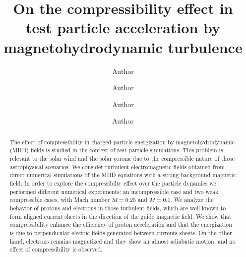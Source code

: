 \documentclass[%
aip,pop,amsmath,amssymb,
 reprint,%
]{revtex4-1}
\begin{document}



\title[]{On the compressibility effect in test particle acceleration 
by magnetohydrodynamic turbulence}%
\author{Author}
 \
\author{Author}
\
\author{Author}
 \
\author{Author}
 \


\begin{abstract}
The effect of compressibility in charged particle energization by 
magnetohydrodynamic (MHD) fields
is studied in the context of test particle simulations. 
This problem is relevant 
to the solar wind and the solar corona due to the compressible 
nature of those astrophysical 
scenarios. We consider turbulent electromagnetic fields obtained from  
direct numerical simulations 
of the MHD equations with a strong background magnetic field.  
In order to explore the compressibilty effect over the particle dynamics 
we performed
different numerical experiments: an incompressible case and two weak 
compressible cases, with 
Mach number $M=0.25$ and $M=0.1$. 
We analyze the behavior of protons 
and electrons in those turbulent fields,  which are well known to form 
aligned current sheets in 
the direction of the guide magnetic field. 
We show that compressibility enhance the 
efficiency of proton acceleration and that the energization 
is due to perpendicular electric 
fields generated between currents sheets. On the other hand, 
electrons remains magnetized and 
they show an almost adiabatic motion, and no effect of compressibility 
is observed.
\end{abstract}

\maketitle

%
\end{document}
